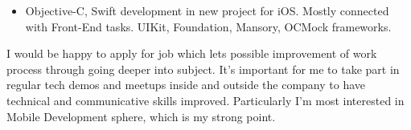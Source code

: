 \documentclass[10pt,a4paper]{cv}
\begin{document}
\begin{itemize}
\item {}
Objective-C, Swift development in new project for iOS. Mostly connected with Front-End tasks. UIKit, Foundation, Mansory, OCMock frameworks.
\end{itemize}

\clearpage

I would be happy to apply for job which lets possible improvement of work process through going deeper into subject. It's important for me to take part in regular tech demos and meetups inside and outside the company to have technical and communicative skills improved. Particularly I’m most interested in Mobile Development sphere, which is my strong point.
\end{document}
